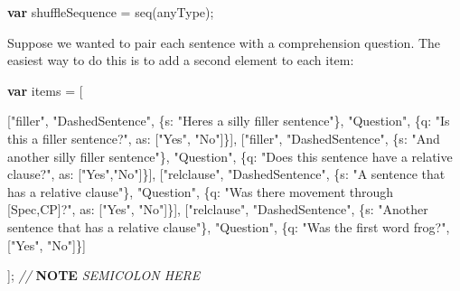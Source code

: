 \documentclass[
]{article}
\newenvironment{Shaded}{}{}
\newcommand{\AlertTok}[1]{\textcolor[rgb]{1.00,0.00,0.00}{\textbf{#1}}}
\newcommand{\CommentTok}[1]{\textcolor[rgb]{0.38,0.63,0.69}{\textit{#1}}}
\newcommand{\DataTypeTok}[1]{\textcolor[rgb]{0.56,0.13,0.00}{#1}}
\newcommand{\FunctionTok}[1]{\textcolor[rgb]{0.02,0.16,0.49}{#1}}
\newcommand{\KeywordTok}[1]{\textcolor[rgb]{0.00,0.44,0.13}{\textbf{#1}}}
\newcommand{\NormalTok}[1]{#1}
\newcommand{\OperatorTok}[1]{\textcolor[rgb]{0.40,0.40,0.40}{#1}}
\newcommand{\StringTok}[1]{\textcolor[rgb]{0.25,0.44,0.63}{#1}}
\begin{document}
\begin{Shaded}
\begin{Highlighting}[]
    \KeywordTok{var}\NormalTok{ shuffleSequence }\OperatorTok{=} \FunctionTok{seq}\NormalTok{(anyType)}\OperatorTok{;}
\end{Highlighting}
\end{Shaded}

Suppose we wanted to pair each sentence with a comprehension question.
The easiest way to do this is to add a second element to each item:

\begin{Shaded}
\begin{Highlighting}[]
    \KeywordTok{var}\NormalTok{ items }\OperatorTok{=}\NormalTok{ [}

\NormalTok{    [}\StringTok{"filler"}\OperatorTok{,} \StringTok{"DashedSentence"}\OperatorTok{,}\NormalTok{ \{}\DataTypeTok{s}\OperatorTok{:} \StringTok{"Here\textquotesingle{}s a silly filler sentence"}\NormalTok{\}}\OperatorTok{,}
               \StringTok{"Question"}\OperatorTok{,}\NormalTok{ \{}\DataTypeTok{q}\OperatorTok{:} \StringTok{"Is this a filler sentence?"}\OperatorTok{,} \DataTypeTok{as}\OperatorTok{:}\NormalTok{ [}\StringTok{"Yes"}\OperatorTok{,} \StringTok{"No"}\NormalTok{]\}]}\OperatorTok{,}
\NormalTok{    [}\StringTok{"filler"}\OperatorTok{,} \StringTok{"DashedSentence"}\OperatorTok{,}\NormalTok{ \{}\DataTypeTok{s}\OperatorTok{:} \StringTok{"And another silly filler sentence"}\NormalTok{\}}\OperatorTok{,}
               \StringTok{"Question"}\OperatorTok{,}\NormalTok{ \{}\DataTypeTok{q}\OperatorTok{:} \StringTok{"Does this sentence have a relative clause?"}\OperatorTok{,} \DataTypeTok{as}\OperatorTok{:}\NormalTok{ [}\StringTok{"Yes"}\OperatorTok{,}\StringTok{"No"}\NormalTok{]\}]}\OperatorTok{,}
\NormalTok{    [}\StringTok{"relclause"}\OperatorTok{,} \StringTok{"DashedSentence"}\OperatorTok{,}\NormalTok{ \{}\DataTypeTok{s}\OperatorTok{:} \StringTok{"A sentence that has a relative clause"}\NormalTok{\}}\OperatorTok{,}
                  \StringTok{"Question"}\OperatorTok{,}\NormalTok{ \{}\DataTypeTok{q}\OperatorTok{:} \StringTok{"Was there movement through [Spec,CP]?"}\OperatorTok{,} \DataTypeTok{as}\OperatorTok{:}\NormalTok{ [}\StringTok{"Yes"}\OperatorTok{,} \StringTok{"No"}\NormalTok{]\}]}\OperatorTok{,}
\NormalTok{    [}\StringTok{"relclause"}\OperatorTok{,} \StringTok{"DashedSentence"}\OperatorTok{,}\NormalTok{ \{}\DataTypeTok{s}\OperatorTok{:} \StringTok{"Another sentence that has a relative clause"}\NormalTok{\}}\OperatorTok{,}
                  \StringTok{"Question"}\OperatorTok{,}\NormalTok{ \{}\DataTypeTok{q}\OperatorTok{:} \StringTok{"Was the first word \textquotesingle{}frog\textquotesingle{}?"}\OperatorTok{,}\NormalTok{ [}\StringTok{"Yes"}\OperatorTok{,} \StringTok{"No"}\NormalTok{]\}]}

\NormalTok{    ]}\OperatorTok{;} \CommentTok{// }\AlertTok{NOTE}\CommentTok{ SEMICOLON HERE}
\end{Highlighting}
\end{Shaded}
\end{document}
